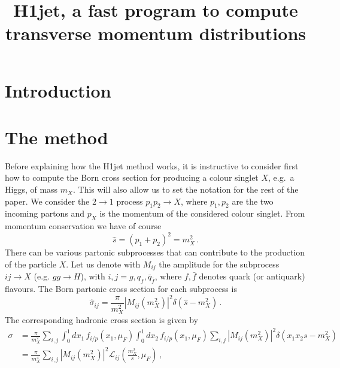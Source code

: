 \documentclass[12pt,a4wide]{article}
\title{H1jet, a fast program to compute transverse momentum distributions}
\begin{document}
\maketitle


\section{Introduction}
\label{sec:intro}

\section{The method}
\label{sec:method}
Before explaining how the H1jet method works, it is instructive to
consider first how to compute the Born cross section for producing a
colour singlet $X$, e.g.\ a Higgs, of mass $m_X$. This will also allow
us to set the notation for the rest of the paper. We consider the
$2\to 1$ process $p_1 p_2 \to X$, where $p_1,p_2$ are the two incoming
partons and $p_X$ is the momentum of the considered colour
singlet. From momentum conservation we have of course
\begin{equation}
  \label{eq:mom-conservation}
  \hat s = (p_1+p_2)^2=m_X^2\,.
\end{equation}
There can be various partonic subprocesses that can contribute to the
production of the particle $X$. Let us denote with $M_{ij}$ the
amplitude for the subprocess $ij\to X$ (e.g. $gg \to H$), with
$i,j=g,q_f,\bar q_{\bar f}$, where $f,\bar f$ denotes quark (or
antiquark) flavours. The Born partonic cross section for each
subprocess is
\begin{equation}
  \label{eq:Born-xsct}
  \hat\sigma_{ij}=\frac{\pi}{m_X^2} |M_{ij}(m_X^2)|^2 \delta\left(\hat s-m_X^2\right)\,.
\end{equation}
The corresponding hadronic cross section is given by
\begin{equation}
  \label{eq:Born-had}
  \begin{split}
  \sigma& =\frac{\pi}{m_X^2}\sum_{i,j} \int_0^1 dx_1\, f_{i/p}(x_1,\mu_F)\int_0^1 dx_2 \, f_{i/p}(x_1,\mu_F)\sum_{i,j}
 |M_{ij}(m_X^2)|^2 \delta\left(x_1 x_2 s-m_X^2\right)\\
   & = \frac{\pi}{m_X^4} \sum_{i,j} |M_{ij}(m_X^2)|^2 \mathcal{L}_{ij}\left(\frac{m_X^2}{s},\mu_F\right)
  \,,
    \end{split}
\end{equation}
\end{document}
